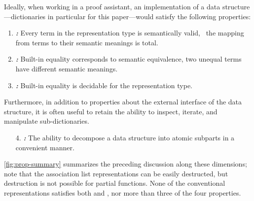 
Ideally, when working in a proof assistant, an implementation of a data structure---dictionaries in particular for this paper---would satisfy the following properties:

\newcommand{\designGoal}[1]
  {\textbf{\emph{#1:}}}

\begin{enumerate}

\item
%
\designGoal{\SemTot}
%
Every term in the representation type is semantically valid, \ie{}~the mapping from terms to their semantic meanings is total.

\item
%
\designGoal{\SemInj}
%
Built-in equality corresponds to semantic equivalence, \ie{} two unequal terms have different semantic meanings.

\item
%
\designGoal{\EqDec}
%
Built-in equality is decidable for the representation type.

\end{enumerate}

Furthermore, in addition to properties about the external interface of the data structure, it is often useful to retain the ability to inspect, iterate, and manipulate sub-dictionaries.
%

\begin{enumerate}

\item[4.]
%
\designGoal{\EzDstr}
%
The ability to decompose a data structure into atomic subparts in a convenient manner.



\end{enumerate}

\autoref{fig:prop-summary} summarizes the preceding discussion along these dimensions; note that the association list representations can be easily destructed, but destruction is not possible for partial functions.
%
None of the conventional representations satisfies both \SemTot{} and \SemInj{}, nor more than three of the four properties.



